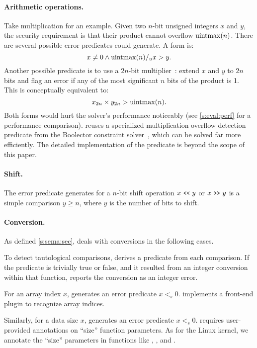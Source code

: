 \paragraph{Arithmetic operations.}
Take multiplication for an example.  Given two $n$-bit unsigned
integers $x$ and $y$, the security requirement is that their product
cannot overflow $\operatorname{uintmax}(n)$.  There are several possible error
predicates \sys could generate.
A \naive form is:
\begin{equation*}
x \neq 0 \land \operatorname{uintmax}(n) /_u x > y.
\end{equation*}
Another possible predicate is to use a $2n$-bit
multiplier~\cite{molnar:catchconv}: extend $x$ and $y$ to $2n$ bits
and flag an error if any of the most significant $n$ bits of the
product is 1.  This is conceptually equivalent to:
\begin{equation*}
x_{2n} \times y_{2n} > \operatorname{uintmax}(n).
\end{equation*}
Both forms would hurt the solver's performance noticeably
(see \autoref{s:eval:perf} for a performance comparison).
%
\sys reuses a specialized multiplication overflow detection predicate
from the Boolector constraint
solver~\cite[\chapterautorefname~3.5]{brummayer:phd}, which can be
solved far more efficiently.  The detailed implementation of the
predicate is beyond the scope of this paper.

\paragraph{Shift.}
The error predicate \sys generates for a $n$-bit shift operation
$x \shl y$ or $x \shr y$ is a simple comparison $y \geq n$, where
$y$ is the number of bits to shift.

\paragraph{Conversion.}
As defined \autoref{s:sema:sec}, \sys deals with conversions
in the following cases.

To detect tautological comparisons, \sys derives a predicate from
each comparison.  If the predicate is trivially true or false,
and it resulted from an integer conversion within that function, \sys
reports the conversion as an integer error.

For an array index $x$, \sys generates an error predicate $x <_s 0$.
\sys implements a front-end plugin to recognize array indices.

Similarly, for a data size $x$, \sys generates an error predicate $x <_s 0$.
\sys requires user-provided annotations on ``size'' function parameters.  As for
the Linux kernel, we annotate the ``size'' parameters in functions like ,
, and .

